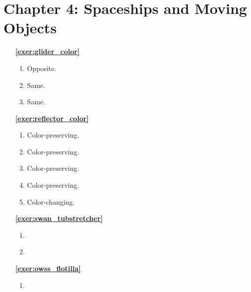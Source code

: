 \section*{Chapter 4: Spaceships and Moving Objects}
\renewcommand{\chapterfolder}{spaceships/}

\begin{multicols}{2}
\begin{itemize}[leftmargin=0em]
	\item[\bf\color{ocre}\sffamily\ref{exer:glider_color}]
		\begin{enumerate}[leftmargin=1.5em,label=\bf\color{ocre}(\alph*)]
			\item Opposite.
			
			\item Same.
			
			\item Same. \\
		\end{enumerate}
		
	
	\item[\bf\color{ocre}\sffamily\ref{exer:reflector_color}]
		\begin{enumerate}[leftmargin=1.5em,label=(\alph*),series=solu_reflector_color]
			\item Color-preserving.
			
			\item Color-preserving.
			
			\item Color-preserving.
			
			\item Color-preserving.
			
			\item Color-changing. \\
		\end{enumerate}
		
	
	\item[\bf\color{ocre}\sffamily\ref{exer:swan_tubstretcher}]
		\begin{enumerate}[leftmargin=1.5em,label=\bf\color{ocre}(\alph*)]
			\item {}
			
			\item {} \\
		\end{enumerate}
		

	\item[\bf\color{ocre}\sffamily\ref{exer:owss_flotilla}]
		\begin{enumerate}[leftmargin=1.5em,label=\bf\color{ocre}(\alph*)]
			\item {}
			

\end{enumerate}
\end{itemize}
\end{multicols}
